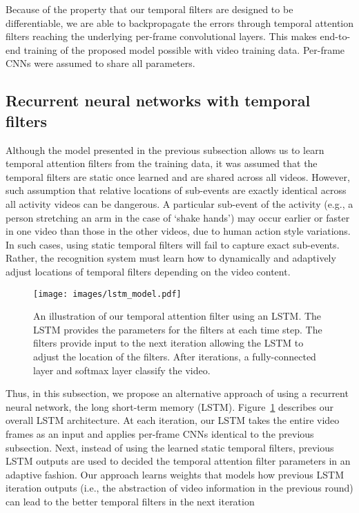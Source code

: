 \documentclass[letterpaper]{article}
\begin{document}
Because of the property that our temporal filters are designed to be differentiable, we are able to backpropagate the errors through temporal attention filters reaching the underlying per-frame convolutional layers. This makes end-to-end training of the proposed model possible with video training data. Per-frame CNNs were assumed to share all parameters.




\subsection{Recurrent neural networks with temporal filters}
\label{subsec:lstm}

Although the model presented in the previous subsection allows us to learn temporal attention filters from the training data, it was assumed that the temporal filters are static once learned and are shared across all videos. However, such assumption that relative locations of sub-events are exactly identical across all activity videos can be dangerous. A particular sub-event of the activity (e.g., a person stretching an arm in the case of `shake hands') may occur earlier or faster in one video than those in the other videos, due to human action style variations. In such cases, using static temporal filters will fail to capture exact sub-events. Rather, the recognition system must learn how to dynamically and adaptively adjust locations of temporal filters depending on the video content.

\begin{figure}[!tbp]
\begin{center}
   \texttt{[image: images/lstm\_model.pdf]}
\end{center}
   \caption{An illustration of our temporal attention filter using an LSTM. The LSTM provides the parameters for the filters at each time step. The filters provide input to the next iteration allowing the LSTM to adjust the location of the filters. After  iterations, a fully-connected layer and softmax layer classify the video. }
\label{fig:lstm_model}		
\end{figure}




Thus, in this subsection, we propose an alternative approach of using a recurrent neural network, the long short-term memory (LSTM). Figure~\ref{fig:lstm_model} describes our overall LSTM architecture. At each iteration, our LSTM takes the entire video frames as an input and applies per-frame CNNs identical to the previous subsection. Next, instead of using the learned static temporal filters, previous LSTM outputs are used to decided the temporal attention filter parameters in an adaptive fashion. Our approach learns weights that models how previous LSTM iteration outputs (i.e., the abstraction of video information in the previous round) can lead to the better temporal filters in the next iteration
\end{document}
